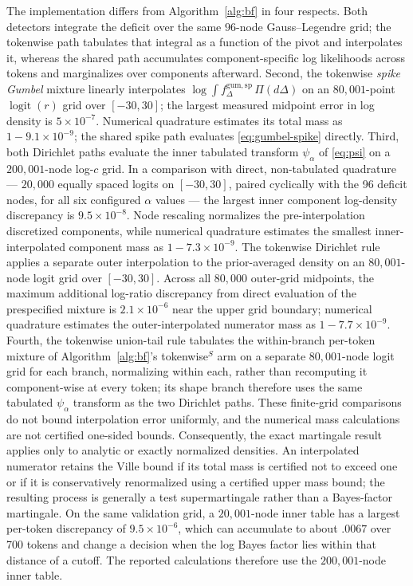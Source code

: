 \documentclass[11pt]{article}
\newcommand{\logit}{\operatorname{logit}}
\begin{document}
The implementation differs from Algorithm~\ref{alg:bf} in four respects.  Both detectors integrate the deficit over the same $96$-node Gauss--Legendre grid; the tokenwise path tabulates that integral as a function of the pivot and interpolates it, whereas the shared path accumulates component-specific log likelihoods across tokens and marginalizes over components afterward.  Second, the tokenwise \emph{spike Gumbel} mixture linearly interpolates $\log\int f_\Delta^{\mathrm{gum},\mathrm{sp}}\,\Pi(d\Delta)$ on an $80{,}001$-point $\logit(r)$ grid over $[-30,30]$; the largest measured midpoint error in log density is $5\times10^{-7}$.  Numerical quadrature estimates its total mass as $1-9.1\times10^{-9}$; the shared spike path evaluates \eqref{eq:gumbel-spike} directly.  Third, both Dirichlet paths evaluate the inner tabulated transform $\psi_\alpha$ of \eqref{eq:psi} on a $200{,}001$-node log-$c$ grid.  In a comparison with direct, non-tabulated quadrature --- $20{,}000$ equally spaced logits on $[-30,30]$, paired cyclically with the 96 deficit nodes, for all six configured $\alpha$ values --- the largest inner component log-density discrepancy is $9.5\times10^{-8}$.  Node rescaling normalizes the pre-interpolation discretized components, while numerical quadrature estimates the smallest inner-interpolated component mass as $1-7.3\times10^{-9}$.  The tokenwise Dirichlet rule applies a separate outer interpolation to the prior-averaged density on an $80{,}001$-node logit grid over $[-30,30]$.  Across all $80{,}000$ outer-grid midpoints, the maximum additional log-ratio discrepancy from direct evaluation of the prespecified mixture is $2.1\times10^{-6}$ near the upper grid boundary; numerical quadrature estimates the outer-interpolated numerator mass as $1-7.7\times10^{-9}$.  Fourth, the tokenwise union-tail rule tabulates the within-branch per-token mixture of Algorithm~\ref{alg:bf}'s tokenwise$^S$ arm on a separate $80{,}001$-node logit grid for each branch, normalizing within each, rather than recomputing it component-wise at every token; its shape branch therefore uses the same tabulated $\psi_\alpha$ transform as the two Dirichlet paths.  These finite-grid comparisons do not bound interpolation error uniformly, and the numerical mass calculations are not certified one-sided bounds.  Consequently, the exact martingale result applies only to analytic or exactly normalized densities.  An interpolated numerator retains the Ville bound if its total mass is certified not to exceed one or if it is conservatively renormalized using a certified upper mass bound; the resulting process is generally a test supermartingale rather than a Bayes-factor martingale.  On the same validation grid, a $20{,}001$-node inner table has a largest per-token discrepancy of $9.5\times10^{-6}$, which can accumulate to about $.0067$ over 700 tokens and change a decision when the log Bayes factor lies within that distance of a cutoff.  The reported calculations therefore use the $200{,}001$-node inner table.
\end{document}
